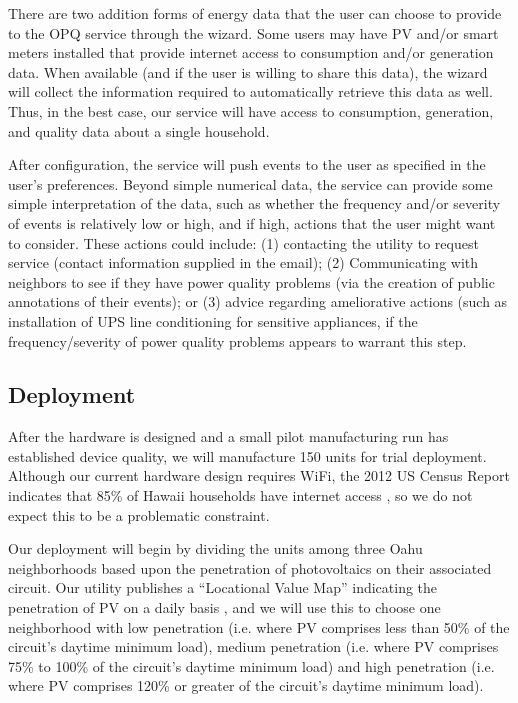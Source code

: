 There are two addition forms of energy data that the user can choose to provide to the OPQ service through the wizard.  Some users may have PV and/or smart meters installed that provide internet access to consumption and/or generation data.  When available (and if the user is willing to share this data), the wizard will collect the information required to automatically retrieve this data as well.  Thus, in the best case, our service will have access to consumption, generation, and quality data about a single household.

After configuration, the service will push events to the user as specified in the user's preferences.  Beyond simple numerical data, the service can provide some simple interpretation of the data, such as whether the frequency and/or severity of events is relatively low or high, and if high, actions that the user might want to consider.  These actions could include: (1) contacting the utility to request service (contact information supplied in the email); (2) Communicating with neighbors to see if they have power quality problems (via the creation of public annotations of their events); or (3) advice regarding ameliorative actions (such as installation of UPS line conditioning for sensitive appliances, if the frequency/severity of power quality problems appears to warrant this step.

\subsection{Deployment}

After the hardware is designed and a small pilot manufacturing run has established device quality, we will manufacture 150 units for trial deployment.  Although our current hardware design requires WiFi, the 2012 US Census Report indicates that 85\% of Hawaii households have internet access \cite{home-internet-access}, so we do not expect this to be a problematic constraint. 

Our deployment will begin by dividing the units among three Oahu neighborhoods based upon the penetration of photovoltaics on their associated circuit.  Our utility publishes a ``Locational Value Map'' indicating the penetration of PV on a daily basis \cite{lvm}, and we will use this to choose one neighborhood with low penetration (i.e. where PV comprises less than 50\% of the circuit's daytime minimum load), medium penetration (i.e. where PV comprises 75\% to 100\% of the circuit's daytime minimum load) and high penetration (i.e. where PV comprises 120\% or greater of the circuit's daytime minimum load). 

